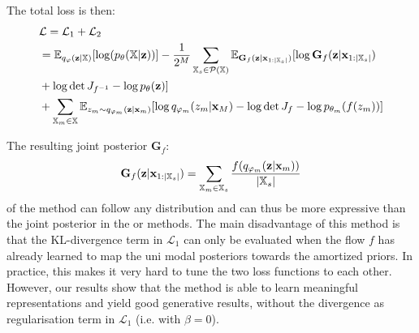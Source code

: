 The total loss is then:
\begin{equation}
    \begin{split}
        &\mathcal{L} = \mathcal{L}_1 + \mathcal{L}_2\\
        &= \mathbb{E}_{q_{\varphi}(\textbf{z}|\mathbb{X})}[\log (p_{\theta}(\mathbb{X}|\textbf{z}))] - \frac{1}{2^M} \sum _{\mathbb{X}_s \in \mathcal{P}(\mathbb{X})} \mathbb{E}_{\textbf{G}_f(\textbf{z}|\textbf{x}_{1:|\mathbb{X}_s|})}[\log \textbf{G}_f(\textbf{z}|\textbf{x}_{1:|\mathbb{X}_s|})\\
        &+ \log \det J_{f^{-1}}- \log p_{\theta}(\textbf{z}) ]\\
        &+ \sum _{\mathbb{X}_m \in \mathbb{X}} \mathbb{E}_{z_m \sim q_{\varphi_m}(\textbf{z}|\textbf{x}_m)} [\log q_{\varphi_m}(z_m|\textbf{x}_M) - \log \det J_f  - \log p_{\theta_m}(f(z_m))]
    \end{split}
\end{equation}

The resulting joint posterior $\textbf{G}_f$:
\begin{equation}
    \textbf{G}_f(\textbf{z}|\textbf{x}_{1:|\mathbb{X}_s|}) =\sum _{\mathbb{X}_m \in \mathbb{X}_s} \frac{f(q_{\varphi_m}(\textbf{z}|\textbf{x}_m))}{|\mathbb{X}_s|}
\end{equation}
of the  method can follow any distribution and can thus be more expressive than the joint posterior in the  or  methods.
The main disadvantage of this method is that the KL-divergence term in $\mathcal{L}_1$ can only be evaluated when the flow $f$ has already learned to map the uni modal posteriors towards the amortized priors.
In practice, this makes it very hard to tune the two loss functions to each other.
However, our results show that the  method is able to learn meaningful representations and yield good generative results, without the divergence as regularisation term in $\mathcal{L}_1$ (i.e. with $\beta = 0$).



